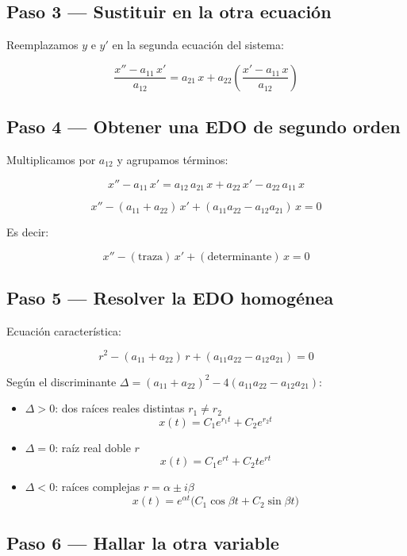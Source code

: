 \documentclass[9pt,a4paper]{article}
\begin{document}
\subsection{Paso 3 --- Sustituir en la otra ecuación}

Reemplazamos \(y\) e \(y'\) en la segunda ecuación del sistema:

\[
\frac{x'' - a_{11}\,x'}{a_{12}} = a_{21}\,x + a_{22}\left(\frac{x' - a_{11}\,x}{a_{12}}\right)
\]

\subsection{Paso 4 --- Obtener una EDO de segundo orden}

Multiplicamos por \(a_{12}\) y agrupamos términos:

\[
x'' - a_{11}\,x' = a_{12}\,a_{21}\,x + a_{22}\,x' - a_{22}\,a_{11}\,x
\]

\[
\boxed{x'' - (a_{11}+a_{22})\,x' + (a_{11}a_{22} - a_{12}a_{21})\,x = 0}
\]

Es decir:

\[
x'' - (\text{traza})\,x' + (\text{determinante})\,x = 0
\]

\subsection{Paso 5 --- Resolver la EDO homogénea}

Ecuación característica:

\[
r^{2} - (a_{11}+a_{22})\,r + (a_{11}a_{22} - a_{12}a_{21}) = 0
\]

Según el discriminante \(\Delta = (a_{11}+a_{22})^{2} - 4(a_{11}a_{22} - a_{12}a_{21})\):

\begin{itemize}
  \item[\textbf{Caso 1}] \(\Delta > 0\): dos raíces reales distintas \(r_1 \neq r_2\)
  \[
  x(t) = C_1 e^{r_1 t} + C_2 e^{r_2 t}
  \]

  \item[\textbf{Caso 2}] \(\Delta = 0\): raíz real doble \(r\)
  \[
  x(t) = C_1 e^{r t} + C_2 t e^{r t}
  \]

  \item[\textbf{Caso 3}] \(\Delta < 0\): raíces complejas \(r = \alpha \pm i\beta\)
  \[
  x(t) = e^{\alpha t}\bigl(C_1 \cos\beta t + C_2 \sin\beta t\bigr)
  \]
\end{itemize}

\subsection{Paso 6 --- Hallar la otra variable}
\end{document}
